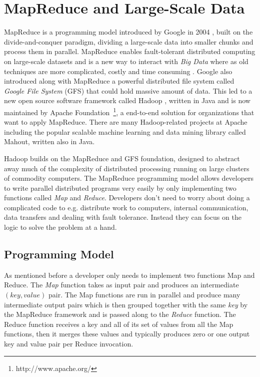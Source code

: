 \section{MapReduce and Large-Scale Data}
MapReduce is a programming model introduced by Google in 2004 \citep{Dean:2004}, built on the divide-and-conquer paradigm, dividing a large-scale data into smaller chunks and process them in parallel. MapReduce enables fault-tolerant distributed computing on large-scale datasets and is a new way to interact with \textit{Big Data} where as old techniques are more complicated, costly and time consuming \citep{Dean:2004, schneider2012Hadoop}. Google also introduced along with MapReduce a powerful distributed file system called \textit{Google File System} (GFS) that could hold massive amount of data. This led to a new open source software framework called Hadoop \citep{bialecki2005hadoop}, written in Java and is now maintained by Apache Foundation~\footnote{http://www.apache.org/}, a end-to-end solution for organizations that want to apply MapReduce. There are many Hadoop-related projects at Apache including the popular scalable machine learning and data mining library called Mahout, written also in Java. 

Hadoop builds on the MapReduce and GFS foundation, designed to abstract away much of the complexity of distributed processing running on large clusters of commodity computers. The MapReduce programming model allows developers to write parallel distributed programs very easily by only implementing two functions called \textit{Map} and \textit{Reduce}. Developers don't need to worry about doing a complicated code to e.g. distribute work to computers, internal communication, data transfers and dealing with fault tolerance. Instead they can focus on the logic to solve the problem at a hand.

\subsection{Programming Model}
As mentioned before a developer only needs to implement two functions Map and Reduce. The \textit{Map} function takes as input pair and produces an intermediate $(key,value)$ pair. The Map functions are run in parallel and produce many intermediate output pairs which is then grouped together with the same \textit{key} by the MapReduce framework and is passed along to the \textit{Reduce} function. The Reduce function receives a key and all of its set of values from all the Map functions, then it merges these values and typically produces zero or one output key and value pair per Reduce invocation.


